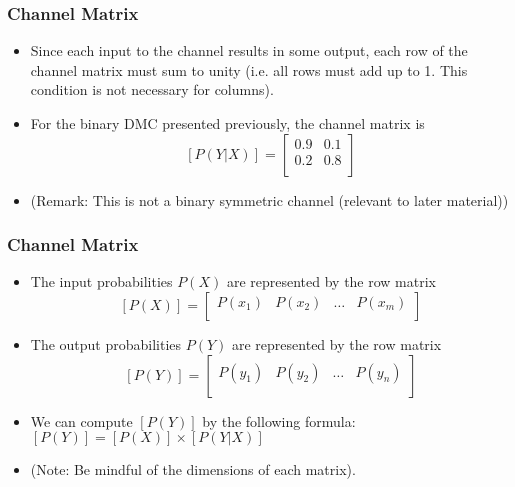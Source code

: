 \documentclass[a4]{beamer}
\begin{document}
\begin{frame}
\frametitle{Channel Matrix}
\begin{itemize}
\item Since each input to the channel results in some
output, each row of the channel matrix must sum to unity (i.e. all rows must add up to 1. This condition is not necessary for columns).
\item For the binary DMC presented previously, the channel matrix is
\[  [P(Y|X)]  = \left[ \begin{array}{cc}
0.9 & 0.1  \\
0.2 & 0.8 \\
\end{array} \right] \]
\item (Remark: This is not a binary symmetric channel (relevant to later material))
\end{itemize}
\end{frame}


\begin{frame}
\frametitle{Channel Matrix}
\begin{itemize}
\item The input probabilities $P(X)$ are represented by the row matrix
\[  [P(X)]  = \left[ \begin{array}{cccc}
P(x_1) & P(x_2) & \ldots & P(x_m) \\
\end{array} \right] \]
\item The output probabilities $P(Y)$ are represented by the row matrix
\[  [P(Y)]  = \left[ \begin{array}{cccc}
P(y_1) & P(y_2) & \ldots & P(y_n) \\
\end{array} \right] \]
\item We can compute $[P(Y)] $ by the following formula: $[P(Y)]  = [P(X)]\times [P(Y|X)]$
\item (Note: Be mindful of the dimensions of each matrix).
\end{itemize}
\end{frame}
\end{document}
